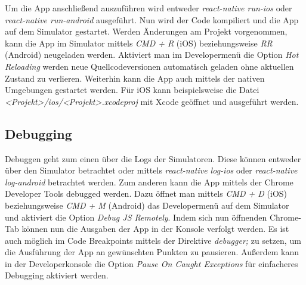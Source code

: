 Um die App anschließend auszuführen wird entweder \textit{react-native run-ios} oder \textit{react-native run-android} ausgeführt. Nun wird der Code kompiliert und die App auf dem Simulator gestartet. Werden Änderungen am Projekt vorgenommen, kann die App im Simulator mittels \textit{CMD + R} (iOS) beziehungsweise \textit{RR} (Android) neugeladen werden. Aktiviert man im Developermenü die Option \textit{Hot Reloading} werden neue Quellcodeversionen automatisch geladen ohne aktuellen Zustand zu verlieren. Weiterhin kann die App auch mittels der nativen Umgebungen gestartet werden. Für iOS kann beispielsweise die Datei \textit{<Projekt>/ios/<Projekt>.xcodeproj} mit Xcode geöffnet und ausgeführt werden.

\subsection{Debugging}
Debuggen geht zum einen über die Logs der Simulatoren. Diese können entweder über den Simulator betrachtet oder mittels \textit{react-native log-ios} oder \textit{react-native log-android} betrachtet werden. Zum anderen kann die App mittels der Chrome Developer Tools debugged werden. Dazu öffnet man mittels \textit{CMD + D} (iOS) beziehungsweise \textit{CMD + M} (Android) das Developermenü auf dem Simulator und aktiviert die Option \textit{Debug JS Remotely}. Indem sich nun öffnenden Chrome-Tab können nun die Ausgaben der App in der Konsole verfolgt werden. Es ist auch möglich im Code Breakpoints mittels der Direktive \textit{debugger;} zu setzen, um die Ausführung der App an gewünschten Punkten zu pausieren.  Außerdem kann in der Developerkonsole die Option \textit{Pause On Caught Exceptions} für einfacheres Debugging aktiviert werden.